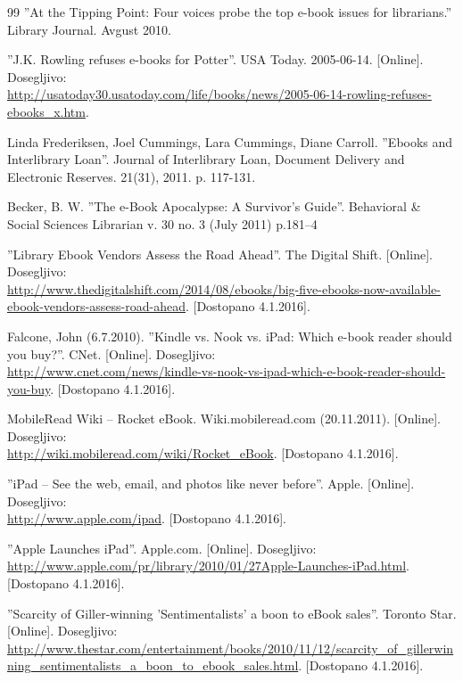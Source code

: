 \documentclass[a4paper, 12pt]{book}
\begin{document}
\begin{thebibliography}{99}
 ''At the Tipping Point: Four voices probe the top e-book issues for librarians.'' Library Journal. Avgust 2010.

 ''J.K. Rowling refuses e-books for Potter''. USA Today. 2005-06-14. 
[Online]. Dosegljivo:\\ \url{http://usatoday30.usatoday.com/life/books/news/2005-06-14-rowling-refuses-ebooks\_x.htm}.

 Linda Frederiksen, Joel Cummings, Lara Cummings, Diane Carroll. ''Ebooks and Interlibrary Loan''.  Journal of Interlibrary Loan, Document Delivery and Electronic Reserves. 21(31), 2011. p. 117-131. 

 Becker, B. W. ''The e-Book Apocalypse: A Survivor's Guide''. Behavioral \& Social Sciences Librarian v. 30 no. 3 (July 2011) p.181–4 

 ''Library Ebook Vendors Assess the Road Ahead''. The Digital Shift. 
[Online]. Dosegljivo:\\
\url{http://www.thedigitalshift.com/2014/08/ebooks/big-five-ebooks-now-available-ebook-vendors-assess-road-ahead}.
[Dostopano 4.1.2016].

 Falcone, John (6.7.2010). ''Kindle vs. Nook vs. iPad: Which e-book reader should you buy?''. CNet.
[Online]. Dosegljivo:\\
\url{http://www.cnet.com/news/kindle-vs-nook-vs-ipad-which-e-book-reader-should-you-buy}.
[Dostopano 4.1.2016].

 MobileRead Wiki – Rocket eBook. Wiki.mobileread.com (20.11.2011). 
[Online]. Dosegljivo:\\ 
\url{http://wiki.mobileread.com/wiki/Rocket\_eBook}.
[Dostopano 4.1.2016].

 ''iPad – See the web, email, and photos like never before''. Apple. 
[Online]. Dosegljivo:\\ 
\url{http://www.apple.com/ipad}.
[Dostopano 4.1.2016].


 ''Apple Launches iPad''. Apple.com.
[Online]. Dosegljivo:\\ 
\url{http://www.apple.com/pr/library/2010/01/27Apple-Launches-iPad.html}.
[Dostopano 4.1.2016].


 ''Scarcity of Giller-winning 'Sentimentalists' a boon to eBook sales''. Toronto Star.
[Online]. Dosegljivo:\\ 
\url{http://www.thestar.com/entertainment/books/2010/11/12/scarcity\_of\_gillerwinning\_sentimentalists\_a\_boon\_to\_ebook\_sales.html}.
[Dostopano 4.1.2016].



\end{thebibliography}
\end{document}
